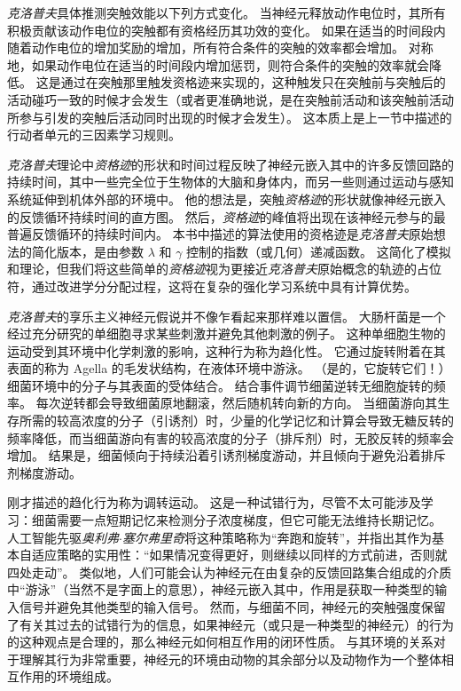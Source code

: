 \textit{克洛普夫}具体推测突触效能以下列方式变化。
当神经元释放动作电位时，其所有积极贡献该动作电位的突触都有资格经历其功效的变化。
如果在适当的时间段内随着动作电位的增加奖励的增加，所有符合条件的突触的效率都会增加。
对称地，如果动作电位在适当的时间段内增加惩罚，则符合条件的突触的效率就会降低。
这是通过在突触那里触发资格迹来实现的，这种触发只在突触前与突触后的活动碰巧一致的时候才会发生（或者更准确地说，是在突触前活动和该突触前活动所参与引发的突触后活动同时出现的时候才会发生）。
这本质上是上一节中描述的行动者单元的三因素学习规则。


\textit{克洛普夫}理论中\textit{资格迹}的形状和时间过程反映了神经元嵌入其中的许多反馈回路的持续时间，其中一些完全位于生物体的大脑和身体内，而另一些则通过运动与感知系统延伸到机体外部的环境中。
他的想法是，突触\textit{资格迹}的形状就像神经元嵌入的反馈循环持续时间的直方图。
然后，\textit{资格迹}的峰值将出现在该神经元参与的最普遍反馈循环的持续时间内。
本书中描述的算法使用的资格迹是\textit{克洛普夫}原始想法的简化版本，是由参数 $\lambda$ 和 $\gamma$ 控制的指数（或几何）递减函数。
这简化了模拟和理论，但我们将这些简单的\textit{资格迹}视为更接近\textit{克洛普夫}原始概念的轨迹的占位符，通过改进学分分配过程，这将在复杂的强化学习系统中具有计算优势。


\textit{克洛普夫}的享乐主义神经元假说并不像乍看起来那样难以置信。
大肠杆菌是一个经过充分研究的单细胞寻求某些刺激并避免其他刺激的例子。
这种单细胞生物的运动受到其环境中化学刺激的影响，这种行为称为趋化性。
它通过旋转附着在其表面的称为 Agella 的毛发状结构，在液体环境中游泳。 （是的，它旋转它们！）细菌环境中的分子与其表面的受体结合。
结合事件调节细菌逆转无细胞旋转的频率。
每次逆转都会导致细菌原地翻滚，然后随机转向新的方向。
当细菌游向其生存所需的较高浓度的分子（引诱剂）时，少量的化学记忆和计算会导致无糖反转的频率降低，而当细菌游向有害的较高浓度的分子（排斥剂）时，无胶反转的频率会增加。
结果是，细菌倾向于持续沿着引诱剂梯度游动，并且倾向于避免沿着排斥剂梯度游动。


刚才描述的趋化行为称为调转运动。
这是一种试错行为，尽管不太可能涉及学习：细菌需要一点短期记忆来检测分子浓度梯度，但它可能无法维持长期记忆。
人工智能先驱\textit{奥利弗$\cdot$塞尔弗里奇}将这种策略称为“奔跑和旋转”，并指出其作为基本自适应策略的实用性：“如果情况变得更好，则继续以同样的方式前进，否则就四处走动”\cite{selfridge1978tracking,selfridge1984some}。
类似地，人们可能会认为神经元在由复杂的反馈回路集合组成的介质中“游泳”（当然不是字面上的意思），神经元嵌入其中，作用是获取一种类型的输入信号并避免其他类型的输入信号。
然而，与细菌不同，神经元的突触强度保留了有关其过去的试错行为的信息，如果神经元（或只是一种类型的神经元）的行为的这种观点是合理的，那么神经元如何相互作用的闭环性质。
与其环境的关系对于理解其行为非常重要，神经元的环境由动物的其余部分以及动物作为一个整体相互作用的环境组成。


